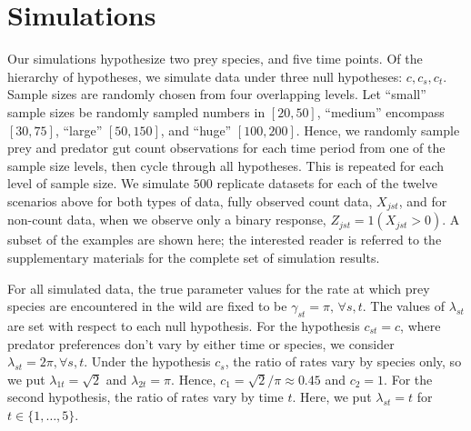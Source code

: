 \section{Simulations}
\label{sec:sim}

Our simulations hypothesize two prey species, and five time points.  Of the hierarchy of hypotheses, we simulate data under three null hypotheses: $c, c_s, c_t$.  Sample sizes are randomly chosen from four overlapping levels.  Let ``small'' sample sizes be randomly sampled numbers in $[20,50]$, ``medium'' encompass $[30,75]$, ``large'' $[50,150]$, and ``huge'' $[100,200]$.  Hence, we randomly sample prey and predator gut count observations for each time period from one of the sample size levels, then cycle through all hypotheses.  This is repeated for each level of sample size.  We simulate $500$ replicate datasets for each of the twelve scenarios above for both types of data, fully observed count data, $X_{jst}$, and for non-count data, when we observe only a binary response, $Z_{jst} = 1(X_{jst}>0)$.  A subset of the examples are shown here; the interested reader is referred to the supplementary materials for the complete set of simulation results.

For all simulated data, the true parameter values for the rate at which prey species are encountered in the wild are fixed to be $\gamma_{st} = \pi, \, \forall s,t$. The values of $\lambda_{st}$ are set with respect to each null hypothesis.  For the hypothesis $c_{st} = c$, where predator preferences don't vary by either time or species, we consider $\lambda_{st} = 2\pi, \forall s,t$.  Under the hypothesis $c_s$, the ratio of rates vary by species only, so we put $\lambda_{1t} = \sqrt{2}$ and $\lambda_{2t} = \pi$.  Hence, $c_1 = \sqrt{2}/\pi \approx 0.45$ and $c_2 = 1$.  For the second hypothesis, the ratio of rates vary by time $t$.  Here, we put $\lambda_{st} = t$ for $t \in \{1, \ldots, 5 \}$.  

